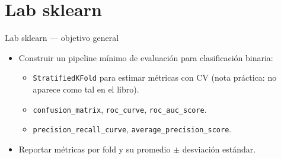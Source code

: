 \section[Lab sklearn]{Lab sklearn\label{sec:labsklearn}}

\begin{frame}{Lab sklearn — objetivo general}
\begin{itemize}
  \item Construir un pipeline mínimo de evaluación para clasificación binaria:
  \begin{itemize}
    \item \texttt{StratifiedKFold} para estimar métricas con CV (nota práctica: no aparece como tal en el libro).
    \item \texttt{confusion\_matrix}, \texttt{roc\_curve}, \texttt{roc\_auc\_score}.
    \item \texttt{precision\_recall\_curve}, \texttt{average\_precision\_score}.
  \end{itemize}
  \item Reportar métricas por fold y su promedio \(\pm\) desviación estándar.
\end{itemize}
\end{frame}

